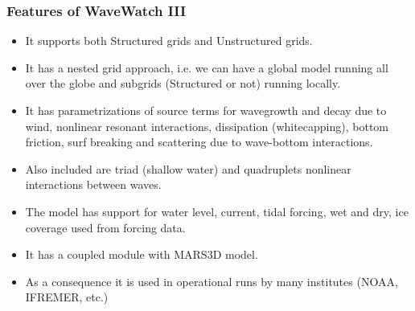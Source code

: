 \documentclass{beamer}
\begin{document}



\begin{frame}[fragile]
  \frametitle{Features of WaveWatch III}

\begin{itemize}
\item It supports both Structured grids and Unstructured grids.
\item It has a nested grid approach, i.e. we can have a global model running all over the globe and subgrids (Structured or not) running locally.
\item It has parametrizations of source terms for wavegrowth and decay due to wind, nonlinear resonant interactions, dissipation (whitecapping), bottom friction, surf breaking and scattering due to wave-bottom interactions.
\item Also included are triad (shallow water) and quadruplets nonlinear interactions between waves.
\item The model has support for water level, current, tidal forcing, wet and dry, ice coverage used from forcing data.
\item It has a coupled module with MARS3D model.
\item As a consequence it is used in operational runs by many institutes (NOAA, IFREMER, etc.)
\end{itemize}
\end{frame}
\end{document}
